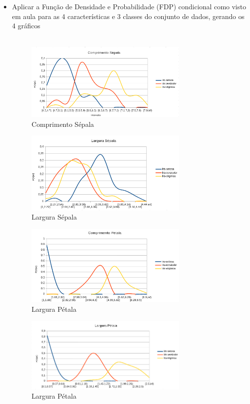 \documentclass[a4paper, 12pt]{article}
\begin{document}
\begin{enumerate}
\begin{itemize}
\item Aplicar a Função de Densidade e Probabilidade (FDP) condicional como visto em aula para as 4 características e 3 classes do conjunto de dados, gerando os 4 gráficos \\\\
    \begin{figure}[h!]
    \centering
    \includegraphics[width=80mm]{img6.png}
    \caption{Comprimento Sépala}
    \end{figure}

    \begin{figure}[h!]
    \centering
    \includegraphics[width=80mm]{img7.png}
    \caption{Largura Sépala}
    \end{figure}

    \begin{figure}[h!]
    \centering
    \includegraphics[width=80mm]{img8.png}
    \caption{Largura Pétala}
    \end{figure}

    \begin{figure}[h!]
    \centering
    \includegraphics[width=80mm]{img9.png}
    \caption{Largura Pétala}
    \end{figure}


\end{itemize}
\end{enumerate}
\end{document}

